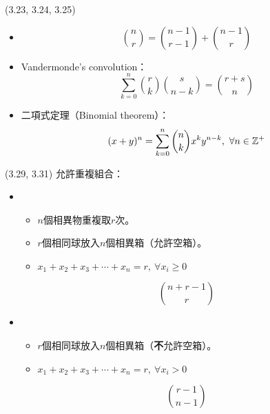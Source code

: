 \item \begin{theorem}{(3.23, 3.24, 3.25)} \quad\quad
    \begin{itemize}
        \item \begin{equation}
            \binom{n}{r}  = \binom{n - 1}{r - 1} + \binom{n - 1}{r}   
        \end{equation}
        \item Vandermonde's convolution：
        \begin{equation}
            \sum_{k = 0}^{n}\binom{r}{k}\binom{s}{n - k} = \binom{r + s}{n}
        \end{equation}
        \item 二項式定理（Binomial theorem）：
        \begin{equation}
            (x + y)^n = \sum_{k = 0}^{n}\binom{n}{k}x^ky^{n - k}, \ \forall n \in \mathbb{Z}^+
        \end{equation}
    \end{itemize}
\end{theorem}

\item \begin{theorem}{(3.29, 3.31)} 允許重複組合：
    \begin{itemize}
        \item \begin{itemize}
            \item $n$個相異物重複取$r$次。
            \item $r$個相同球放入$n$個相異箱（允許空箱）。
            \item $x_1 + x_2 + x_3 + \cdots + x_n = r, \ \forall x_i \ge 0$
        \end{itemize}
        \begin{equation}
            \binom{n + r - 1}{r}
        \end{equation}
        \item \begin{itemize}
            \item $r$個相同球放入$n$個相異箱（\textbf{不}允許空箱）。
            \item $x_1 + x_2 + x_3 + \cdots + x_n = r, \ \forall x_i > 0$
        \end{itemize}
        \begin{equation}
            \binom{r - 1}{n - 1}
        \end{equation}
    \end{itemize}
\end{theorem}

